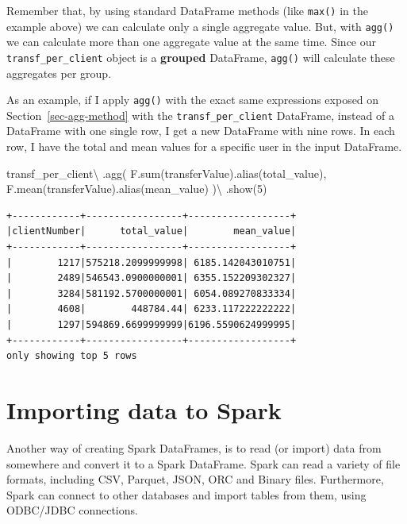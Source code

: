 \documentclass[
  11pt,
  letterpaper,
  DIV=11,
  numbers=noendperiod]{scrreprt}
\newenvironment{Shaded}{\begin{snugshade}}{\end{snugshade}}
\newcommand{\BuiltInTok}[1]{\textcolor[rgb]{0.00,0.23,0.31}{#1}}
\newcommand{\DecValTok}[1]{\textcolor[rgb]{0.68,0.00,0.00}{#1}}
\newcommand{\NormalTok}[1]{\textcolor[rgb]{0.00,0.23,0.31}{#1}}
\newcommand{\OperatorTok}[1]{\textcolor[rgb]{0.37,0.37,0.37}{#1}}
\newcommand{\StringTok}[1]{\textcolor[rgb]{0.13,0.47,0.30}{#1}}
\begin{document}
Remember that, by using standard DataFrame methods (like \texttt{max()}
in the example above) we can calculate only a single aggregate value.
But, with \texttt{agg()} we can calculate more than one aggregate value
at the same time. Since our \texttt{transf\_per\_client} object is a
\textbf{grouped} DataFrame, \texttt{agg()} will calculate these
aggregates per group.

As an example, if I apply \texttt{agg()} with the exact same expressions
exposed on Section~\ref{sec-agg-method} with the
\texttt{transf\_per\_client} DataFrame, instead of a DataFrame with one
single row, I get a new DataFrame with nine rows. In each row, I have
the total and mean values for a specific user in the input DataFrame.

\begin{Shaded}
\begin{Highlighting}[]
\NormalTok{transf\_per\_client}\OperatorTok{\textbackslash{}}
\NormalTok{  .agg(}
\NormalTok{    F.}\BuiltInTok{sum}\NormalTok{(}\StringTok{\textquotesingle{}transferValue\textquotesingle{}}\NormalTok{).alias(}\StringTok{\textquotesingle{}total\_value\textquotesingle{}}\NormalTok{),}
\NormalTok{    F.mean(}\StringTok{\textquotesingle{}transferValue\textquotesingle{}}\NormalTok{).alias(}\StringTok{\textquotesingle{}mean\_value\textquotesingle{}}\NormalTok{)}
\NormalTok{  )}\OperatorTok{\textbackslash{}}
\NormalTok{  .show(}\DecValTok{5}\NormalTok{)}
\end{Highlighting}
\end{Shaded}

\begin{verbatim}
+------------+-----------------+------------------+
|clientNumber|      total_value|        mean_value|
+------------+-----------------+------------------+
|        1217|575218.2099999998| 6185.142043010751|
|        2489|546543.0900000001| 6355.152209302327|
|        3284|581192.5700000001| 6054.089270833334|
|        4608|        448784.44| 6233.117222222222|
|        1297|594869.6699999999|6196.5590624999995|
+------------+-----------------+------------------+
only showing top 5 rows
\end{verbatim}


\chapter{Importing data to Spark}\label{sec-import}

Another way of creating Spark DataFrames, is to read (or import) data
from somewhere and convert it to a Spark DataFrame. Spark can read a
variety of file formats, including CSV, Parquet, JSON, ORC and Binary
files. Furthermore, Spark can connect to other databases and import
tables from them, using ODBC/JDBC connections.
\end{document}
